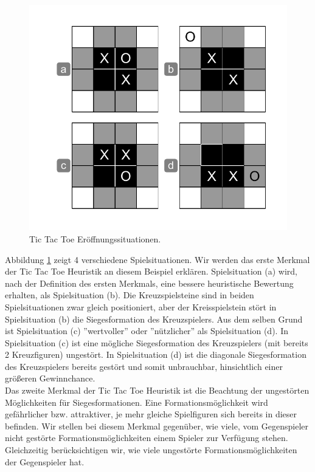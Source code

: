 \begin{figure}[!htbp]
  \centering
  \includegraphics[scale = 0.5]{inhalt/abbildungen/tictactoe_mid_control.pdf}
  \caption{Tic Tac Toe Eröffnungssituationen.}
  \label{fig:tictactoe_mid_control}
\end{figure}

Abbildung \ref{fig:tictactoe_mid_control} zeigt 4 verschiedene Spielsituationen. Wir werden das erste Merkmal der Tic Tac Toe Heuristik an diesem Beispiel erklären. Spielsituation (a) wird, nach der Definition des ersten Merkmals, eine bessere heuristische Bewertung erhalten, als Spielsituation (b). Die Kreuzspielsteine sind in beiden Spielsituationen zwar gleich positioniert, aber der Kreisspielstein stört in Spielsituation (b) die Siegesformation des Kreuzspielers. Aus dem selben Grund ist Spielsituation (c) ''wertvoller'' oder ''nützlicher'' als Spielsituation (d). In Spielsituation (c) ist eine mögliche Siegesformation des Kreuzspielers (mit bereits 2 Kreuzfiguren) ungestört. In Spielsituation (d) ist die diagonale Siegesformation des Kreuzspielers bereits gestört und somit unbrauchbar, hinsichtlich einer größeren Gewinnchance. \\

Das zweite Merkmal der Tic Tac Toe Heuristik ist die Beachtung der ungestörten Möglichkeiten für Siegesformationen. Eine Formationsmöglichkeit wird gefährlicher bzw. attraktiver, je mehr gleiche Spielfiguren sich bereits in dieser befinden. Wir stellen bei diesem Merkmal gegenüber, wie viele, vom Gegenspieler nicht gestörte Formationsmöglichkeiten  einem Spieler zur Verfügung stehen. Gleichzeitig berücksichtigen wir, wie viele ungestörte Formationsmöglichkeiten der Gegenspieler hat. \\

